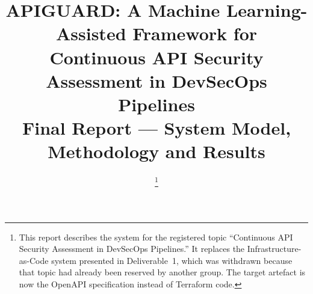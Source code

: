 \documentclass[conference]{IEEEtran}
\begin{document}
\title{APIGUARD: A Machine Learning-Assisted Framework for\\
Continuous API Security Assessment in DevSecOps Pipelines\\
\large Final Report --- System Model, Methodology and Results}

\author{
\thanks{This report describes the system for the registered topic
``Continuous API Security Assessment in DevSecOps Pipelines.'' It replaces the
Infrastructure-as-Code system presented in Deliverable~1, which was withdrawn because that
topic had already been reserved by another group. The target artefact is now the OpenAPI specification instead of Terraform code.}}

\maketitle
\end{document}
